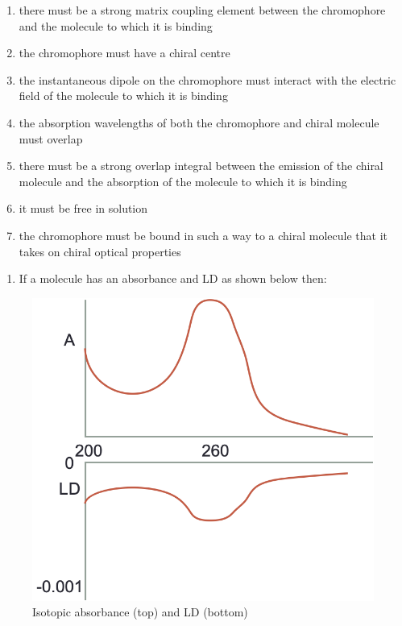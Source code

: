 \documentclass[
]{book}
\providecommand{\tightlist}{%
  \setlength{\itemsep}{0pt}\setlength{\parskip}{0pt}}
\begin{document}
\begin{enumerate}
\def\labelenumi{\alph{enumi}.}
\tightlist
\item
  there must be a strong matrix coupling element between the chromophore and the molecule to which it is binding
\item
  the chromophore must have a chiral centre
\item
  the instantaneous dipole on the chromophore must interact with the electric field of the molecule to which it is binding
\item
  the absorption wavelengths of both the chromophore and chiral molecule must overlap
\item
  there must be a strong overlap integral between the emission of the chiral molecule and the absorption of the molecule to which it is binding
\item
  it must be free in solution
\item
  the chromophore must be bound in such a way to a chiral molecule that it takes on chiral optical properties
\end{enumerate}

\begin{enumerate}
\def\labelenumi{\arabic{enumi}.}
\setcounter{enumi}{3}
\tightlist
\item
  If a molecule has an absorbance and LD as shown below then:
\end{enumerate}

\begin{figure}

{\centering \includegraphics[width=0.6\linewidth]{images/LDquestion} 

}

\caption{Isotopic absorbance (top) and LD (bottom)}\label{fig:LDquestion}
\end{figure}
\end{document}
